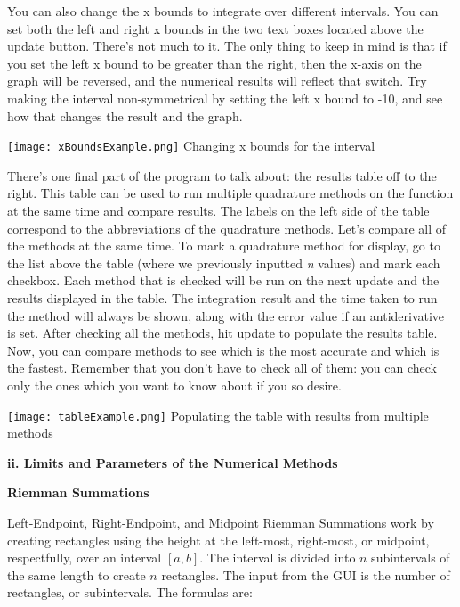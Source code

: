 \documentclass[12pt]{article}
\newcommand{\newLine}{\vspace{5mm}}
\newcommand{\nextsubsection}[1]{\newLine \noindent \large \textbf{#1} \normalsize}
\begin{document}
\newLine You can also change the x bounds to integrate over different intervals. You can set both the left and right x bounds in the two text boxes located above the update button. There's not much to it. The only thing to keep in mind is that if you set the left x bound to be greater than the right, then the x-axis on the graph will be reversed, and the numerical results will reflect that switch. Try making the interval non-symmetrical by setting the left x bound to -10, and see how that changes the result and the graph.

\begin{center}
\texttt{[image: xBoundsExample.png]}
\small Changing x bounds for the interval
\normalsize
\end{center}

\newLine There's one final part of the program to talk about: the results table off to the right. This table can be used to run multiple quadrature methods on the function at the same time and compare results. The labels on the left side of the table correspond to the abbreviations of the quadrature methods. Let's compare all of the methods at the same time. To mark a quadrature method for display, go to the list above the table (where we previously inputted \emph{n} values) and mark each checkbox. Each method that is checked will be run on the next update and the results displayed in the table. The integration result and the time taken to run the method will always be shown, along with the error value if an antiderivative is set. After checking all the methods, hit update to populate the results table. Now, you can compare methods to see which is the most accurate and which is the fastest. Remember that you don't have to check all of them: you can check only the ones which you want to know about if you so desire.

\begin{center}
\texttt{[image: tableExample.png]}
\small Populating the table with results from multiple methods
\normalsize
\end{center}

\nextsubsection{ii. Limits and Parameters of the Numerical Methods}

\newLine\noindent  \textbf{Riemman Summations}

Left-Endpoint, Right-Endpoint, and Midpoint Riemman Summations work by creating rectangles using the height at the left-most, right-most, or midpoint, respectfully, over an interval $[a,b]$. The interval is divided into $n$ subintervals of the same length to create $n$ rectangles. The input from the GUI is the number of rectangles, or subintervals. The formulas are:
\end{document}
